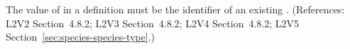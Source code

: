 The value of  in a \Species definition must be the
identifier of an existing \SpeciesType.  (References: L2V2
Section~4.8.2; L2V3 Section~4.8.2; L2V4 Section~4.8.2; L2V5 Section~\ref{sec:species-species-type}.)
